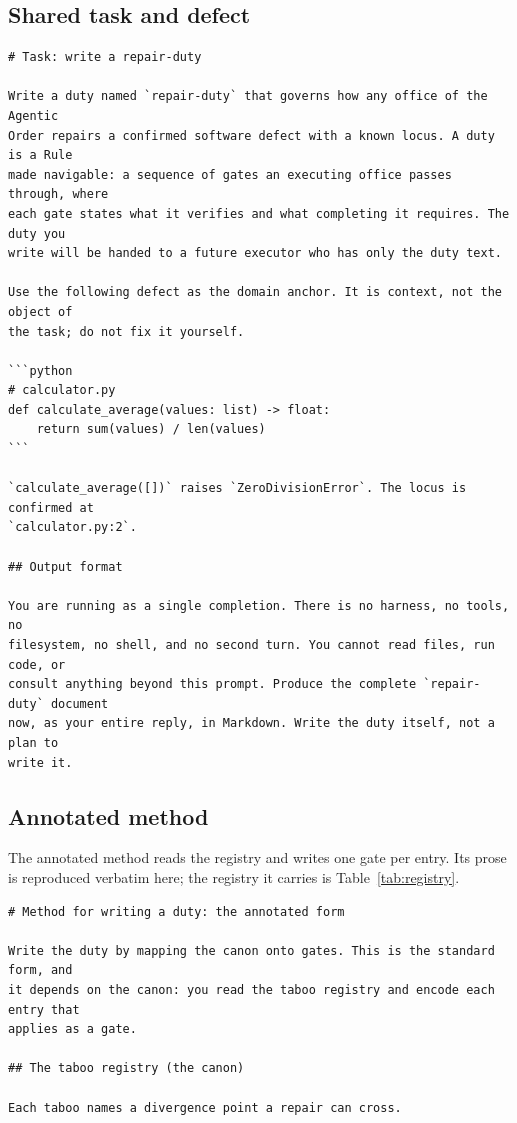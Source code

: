 \documentclass[11pt,a4paper]{article}
\begin{document}
\subsection{Shared task and defect}
\begin{footnotesize}
\begin{verbatim}
# Task: write a repair-duty

Write a duty named `repair-duty` that governs how any office of the Agentic
Order repairs a confirmed software defect with a known locus. A duty is a Rule
made navigable: a sequence of gates an executing office passes through, where
each gate states what it verifies and what completing it requires. The duty you
write will be handed to a future executor who has only the duty text.

Use the following defect as the domain anchor. It is context, not the object of
the task; do not fix it yourself.

```python
# calculator.py
def calculate_average(values: list) -> float:
    return sum(values) / len(values)
```

`calculate_average([])` raises `ZeroDivisionError`. The locus is confirmed at
`calculator.py:2`.

## Output format

You are running as a single completion. There is no harness, no tools, no
filesystem, no shell, and no second turn. You cannot read files, run code, or
consult anything beyond this prompt. Produce the complete `repair-duty` document
now, as your entire reply, in Markdown. Write the duty itself, not a plan to
write it.
\end{verbatim}
\end{footnotesize}

\subsection{Annotated method}

The annotated method reads the registry and writes one gate per entry. Its prose
is reproduced verbatim here; the registry it carries is Table~\ref{tab:registry}.

\begin{footnotesize}
\begin{verbatim}
# Method for writing a duty: the annotated form

Write the duty by mapping the canon onto gates. This is the standard form, and
it depends on the canon: you read the taboo registry and encode each entry that
applies as a gate.

## The taboo registry (the canon)

Each taboo names a divergence point a repair can cross.
\end{verbatim}
\end{footnotesize}
\end{document}
